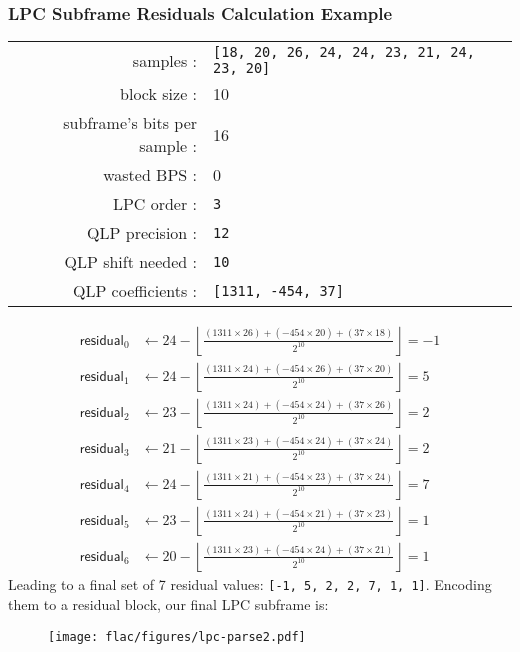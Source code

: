 \subsubsection{LPC Subframe Residuals Calculation Example}
{
  \begin{tabular}{rl}
    \textsf{samples} : & \texttt{[18, 20, 26, 24, 24, 23, 21, 24, 23, 20]} \\
    \textsf{block size} : & 10 \\
    \textsf{subframe's bits per sample} : & 16 \\
    \textsf{wasted BPS} : & 0 \\
    \textsf{LPC order} : & \texttt{3} \\
    \textsf{QLP precision} : &\texttt{12} \\
    \textsf{QLP shift needed} : & \texttt{10} \\
    \textsf{QLP coefficients} : & \texttt{[1311, -454, 37]} \\
  \end{tabular}
  \newline
  \begin{align*}
    \textsf{residual}_0 &\leftarrow 24 - \left\lfloor\frac{(1311 \times 26) + (-454 \times 20) + (37 \times 18)}{2 ^ {10}}\right\rfloor = -1 \\
    \textsf{residual}_1 &\leftarrow 24 - \left\lfloor\frac{(1311 \times 24) + (-454 \times 26) + (37 \times 20)}{2 ^ {10}}\right\rfloor = 5 \\
    \textsf{residual}_2 &\leftarrow 23 - \left\lfloor\frac{(1311 \times 24) + (-454 \times 24) + (37 \times 26)}{2 ^ {10}}\right\rfloor = 2 \\
    \textsf{residual}_3 &\leftarrow 21 - \left\lfloor\frac{(1311 \times 23) + (-454 \times 24) + (37 \times 24)}{2 ^ {10}}\right\rfloor = 2 \\
    \textsf{residual}_4 &\leftarrow 24 - \left\lfloor\frac{(1311 \times 21) + (-454 \times 23) + (37 \times 24)}{2 ^ {10}}\right\rfloor = 7 \\
    \textsf{residual}_5 &\leftarrow 23 - \left\lfloor\frac{(1311 \times 24) + (-454 \times 21) + (37 \times 23)}{2 ^ {10}}\right\rfloor = 1 \\
    \textsf{residual}_6 &\leftarrow 20 - \left\lfloor\frac{(1311 \times 23) + (-454 \times 24) + (37 \times 21)}{2 ^ {10}}\right\rfloor = 1
  \end{align*}
  Leading to a final set of 7 residual values: \texttt{[-1, 5, 2, 2, 7, 1, 1]}.
  Encoding them to a residual block, our final LPC subframe is:
}
\begin{figure}[h]
\texttt{[image: flac/figures/lpc-parse2.pdf]}
\end{figure}
